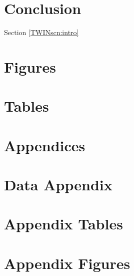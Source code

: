 \documentclass{article}[11pt,subeqn]
\begin{document}
\begin{spacing}{1.4}
\section{Conclusion}                               \label{TWINscn:conclusion}

Section \ref{TWINscn:intro}
\newpage
\section*{Figures}


\clearpage
\section*{Tables}

\clearpage




\newpage
\appendix
\section*{Appendices}
\section{Data Appendix}
\section{Appendix Tables}
\section{Appendix Figures}




\end{spacing}
\end{document}
